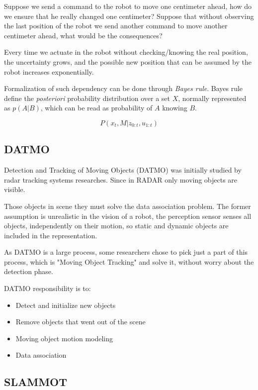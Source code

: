 Suppose we send a command to the robot to move one centimeter ahead, how do we ensure that he really changed one centimeter? Suppose that without observing the last position of the robot we send another command to move another centimeter ahead, what would be the consequences? 

Every time we actuate in the robot without checking/knowing the real position, the uncertainty grows, and the possible new position that can be assumed by the robot increases exponentially.

Formalization of such dependency can be done through \textit{Bayes rule}. Bayes rule define the \textit{posteriori} probability distribution over a set $X$, normally represented as $p(A | B)$, which can be read as probability of $A$ knowing $B$.

\begin{equation}
\label{jpd:discrete}
P(x_t,M | z_{0:t}, u_{1:t})
\end{equation}

\subsection{DATMO}

Detection and Tracking of Moving Objects (DATMO) was initially studied by radar tracking systems \cite{VU-2009-454238} researches. Since in RADAR only moving objects are visible.

Those objects in scene they must solve the data association problem. The former assumption is unrealistic in the vision of a robot, the perception sensor senses all objects, independently on their motion, so static and dynamic objects are included in the representation.

As DATMO is a large process, some researchers chose to pick just a part of this process, which is "Moving Object Tracking" and solve it, without worry about the detection phase.

DATMO responsibility is to:

\begin{itemize}
\item Detect and initialize new objects
\item Remove objects that went out of the scene
\item Moving object motion modeling
\item Data association
\end{itemize}

\subsection{SLAMMOT}

